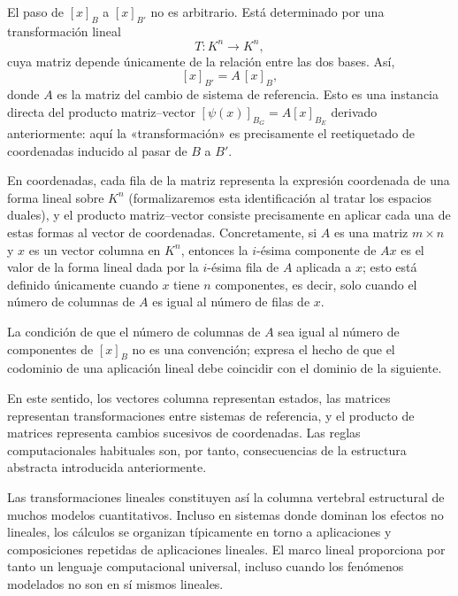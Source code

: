 El paso de $[x]_B$ a $[x]_{B'}$ no es arbitrario. Está determinado por una transformación lineal
\[
T : K^n \longrightarrow K^n,
\]
cuya matriz depende únicamente de la relación entre las dos bases. Así,
\[
[x]_{B'} = A\,[x]_B,
\]
donde $A$ es la matriz del cambio de sistema de referencia.
Esto es una instancia directa del producto matriz--vector $[\psi(x)]_{B_G} = A[x]_{B_E}$
derivado anteriormente: aquí la «transformación» es precisamente el reetiquetado de coordenadas
inducido al pasar de $B$ a $B'$.

\medskip

En coordenadas, cada fila de la matriz representa la expresión coordenada de una forma lineal sobre $K^n$ (formalizaremos esta identificación al tratar los espacios duales), y el producto matriz--vector consiste precisamente en aplicar cada una de estas formas al vector de coordenadas. Concretamente, si $A$ es una matriz $m\times n$ y $x$ es un vector columna en $K^n$, entonces la $i$-ésima componente de $Ax$ es el valor de la forma lineal dada por la $i$-ésima fila de $A$ aplicada a $x$; esto está definido únicamente cuando $x$ tiene $n$ componentes, es decir, solo cuando el número de columnas de $A$ es igual al número de filas de $x$.

\medskip

La condición de que el número de columnas de $A$ sea igual al número de componentes de $[x]_B$ no es una convención; expresa el hecho de que el codominio de una aplicación lineal debe coincidir con el dominio de la siguiente.

\medskip

En este sentido, los vectores columna representan estados, las matrices representan transformaciones entre sistemas de referencia, y el producto de matrices representa cambios sucesivos de coordenadas. Las reglas computacionales habituales son, por tanto, consecuencias de la estructura abstracta introducida anteriormente.

\medskip


Las transformaciones lineales constituyen así la columna vertebral estructural de muchos modelos cuantitativos.
Incluso en sistemas donde dominan los efectos no lineales, los cálculos se organizan típicamente
en torno a aplicaciones y composiciones repetidas de aplicaciones lineales. El marco lineal
proporciona por tanto un lenguaje computacional universal, incluso cuando los fenómenos modelados
no son en sí mismos lineales.

